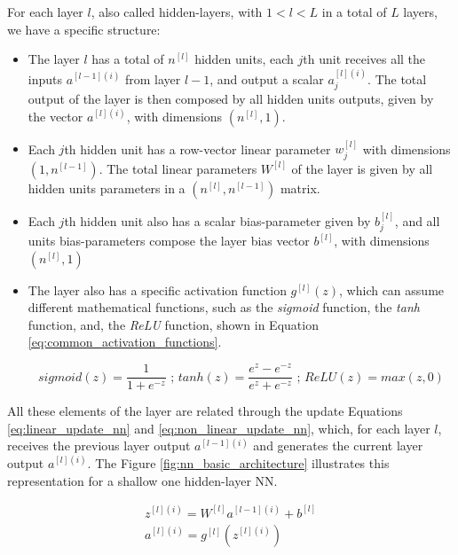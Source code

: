 For each layer $l$, also called hidden-layers, with $1<l<L$ in a total of $L$ layers, we have a specific structure:
\begin{itemize}

\item
	The layer $l$ has a total of $n^{[l]}$ hidden units, each $j$th unit receives all the inputs $a^{[l-1](i)}$ from layer $l-1$, and output a scalar $a^{[l](i)}_j$. The total output of the layer is then composed by all hidden units outputs, given by the vector $a^{[l](i)}$, with dimensions $(n^{[l]},1)$.
	
\item
	Each $j$th hidden unit has a row-vector linear parameter $w^{[l]}_j$ with dimensions $(1,n^{[l-1]})$. The total linear parameters $W^{[l]}$ of the layer is given by all hidden units parameters in a $(n^{[l]},n^{[l-1]})$ matrix.
	
\item
	Each $j$th hidden unit also has a scalar bias-parameter given by $b^{[l]}_j$, and all units bias-parameters compose the layer bias vector $b^{[l]}$, with dimensions $(n^{[l]},1)$
	
\item
	The layer also has a specific activation function $g^{[l]}(z)$, which can assume different mathematical functions, such as the \textit{sigmoid} function, the \textit{tanh} function, and, the \textit{ReLU} function, shown in Equation \eqref{eq:common_activation_functions}.

\begin{equation}
sigmoid(z) = \frac{1}{1+e^{-z}} \text{ ; } tanh(z) = \frac{e^z - e^{-z}}{e^z + e^{-z}} \text{ ; } ReLU(z) = max(z,0)
\label{eq:common_activation_functions}
\end{equation}

\end{itemize}

All these elements of the layer are related through the update Equations \eqref{eq:linear_update_nn} and \eqref{eq:non_linear_update_nn}, which, for each layer $l$, receives the previous layer output $a^{[l-1](i)}$ and generates the current layer output $a^{[l](i)}$. The Figure \ref{fig:nn_basic_architecture} illustrates this representation for a shallow one hidden-layer NN.

\begin{align}
z^{[l](i)} = W^{[l]}a^{[l-1](i)} + b^{[l]}
\label{eq:linear_update_nn}
\\
a^{[l](i)} = g^{[l]}(z^{[l](i)})
\label{eq:non_linear_update_nn}
\end{align}

